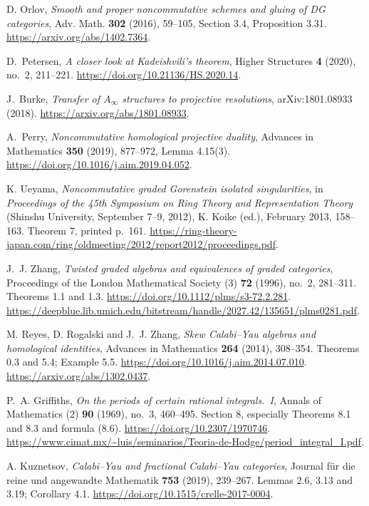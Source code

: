  D. Orlov,
\emph{Smooth and proper noncommutative schemes and gluing of DG categories},
Adv. Math. \textbf{302} (2016), 59--105, Section 3.4, Proposition 3.31.
\url{https://arxiv.org/abs/1402.7364}.

 D.~Petersen,
\emph{A closer look at Kadeishvili's theorem},
Higher Structures \textbf{4} (2020), no.~2, 211--221.
\url{https://doi.org/10.21136/HS.2020.14}.

 J.~Burke,
\emph{Transfer of $A_\infty$ structures to projective resolutions},
arXiv:1801.08933 (2018).
\url{https://arxiv.org/abs/1801.08933}.

 A.~Perry,
\emph{Noncommutative homological projective duality},
Advances in Mathematics \textbf{350} (2019), 877--972,
Lemma 4.15(3).
\url{https://doi.org/10.1016/j.aim.2019.04.052}.

K. Ueyama,
\emph{Noncommutative graded Gorenstein isolated singularities},
in \emph{Proceedings of the 45th Symposium on Ring Theory and Representation Theory}
(Shinshu University, September 7--9, 2012),
K. Koike (ed.), February 2013, 158--163.
Theorem 7, printed p.~161.
\url{https://ring-theory-japan.com/ring/oldmeeting/2012/report2012/proceedings.pdf}.

J.~J. Zhang,
\emph{Twisted graded algebras and equivalences of graded categories},
Proceedings of the London Mathematical Society (3) \textbf{72} (1996), no.~2, 281--311.
Theorems 1.1 and 1.3.
\url{https://doi.org/10.1112/plms/s3-72.2.281}.
\url{https://deepblue.lib.umich.edu/bitstream/handle/2027.42/135651/plms0281.pdf}.

M. Reyes, D. Rogalski and J.~J. Zhang,
\emph{Skew Calabi--Yau algebras and homological identities},
Advances in Mathematics \textbf{264} (2014), 308--354.
Theorems 0.3 and 5.4; Example 5.5.
\url{https://doi.org/10.1016/j.aim.2014.07.010}.
\url{https://arxiv.org/abs/1302.0437}.

P.~A. Griffiths,
\emph{On the periods of certain rational integrals.~I},
Annals of Mathematics (2) \textbf{90} (1969), no.~3, 460--495.
Section 8, especially Theorems 8.1 and 8.3 and formula (8.6).
\url{https://doi.org/10.2307/1970746}.
\url{https://www.cimat.mx/~luis/seminarios/Teoria-de-Hodge/period_integral_I.pdf}.

A. Kuznetsov,
\emph{Calabi--Yau and fractional Calabi--Yau categories},
Journal f\"ur die reine und angewandte Mathematik \textbf{753} (2019), 239--267.
Lemmas 2.6, 3.13 and 3.19; Corollary 4.1.
\url{https://doi.org/10.1515/crelle-2017-0004}.

